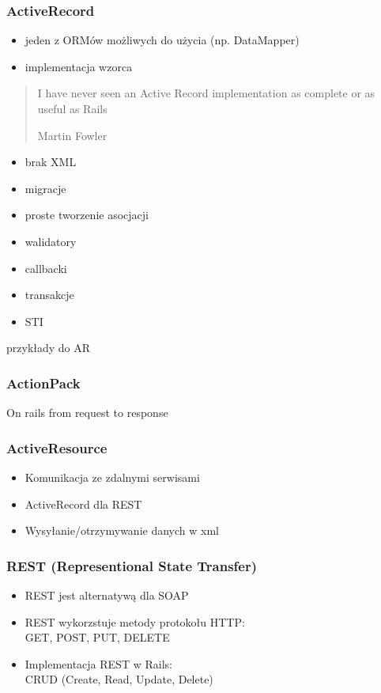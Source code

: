 \documentclass[12t]{beamer}
\begin{document}
\begin{frame}
  \frametitle{ActiveRecord}
  \begin{itemize}
  \item jeden z ORMów możliwych do użycia (np. DataMapper)
  \item implementacja wzorca
  \end{itemize}
\end{frame}

\begin{frame}
  \begin{quote}
    I have never seen an Active Record implementation as complete or as useful as Rails

    \hfill Martin Fowler
  \end{quote}
\end{frame}

\begin{frame}
  \begin{itemize}
  \item brak XML
  \item migracje
  \item proste tworzenie asocjacji
  \item walidatory
  \item callbacki
  \item transakcje
  \item STI
  \end{itemize}
\end{frame}

\begin{frame}
  przykłady do AR
\end{frame}

\begin{frame}
  \frametitle{ActionPack}
  On rails from request to response
\end{frame}

\begin{frame}
  \frametitle{ActiveResource}
  	\begin{itemize}
			\item Komunikacja ze zdalnymi serwisami
			\item ActiveRecord dla REST
			\item Wysyłanie/otrzymywanie danych w xml
		\end{itemize}
\end{frame}

\begin{frame}
  \frametitle{REST (Representional State Transfer)}
  	\begin{itemize}
			\item REST jest alternatywą dla SOAP
			\item REST wykorzstuje metody protokołu HTTP:\\
				GET, POST, PUT, DELETE
			\item Implementacja REST w Rails:\\
				CRUD (Create, Read, Update, Delete)
			\end{itemize}
\end{frame}
\end{document}
